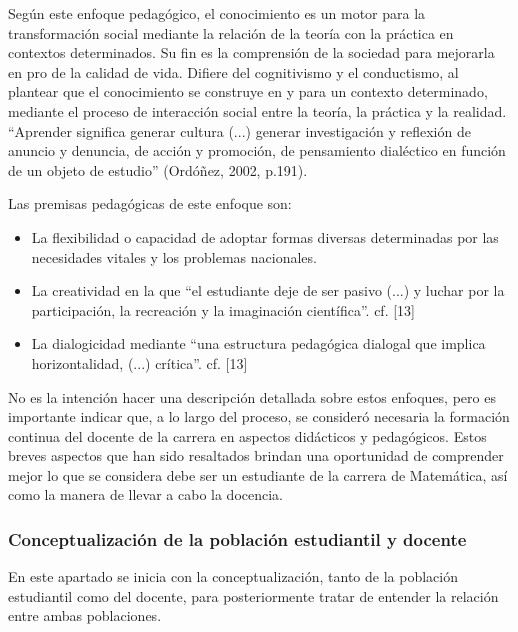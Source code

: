 Según este enfoque pedagógico, el conocimiento es un motor para la transformación social mediante la relación de la teoría con la práctica en contextos determinados. Su fin es la comprensión de la sociedad para mejorarla en pro de la calidad de vida. Difiere del cognitivismo y el conductismo, al plantear que el conocimiento se construye en y para un contexto determinado, mediante el proceso de interacción social entre la teoría, la práctica y la realidad. “Aprender significa generar cultura (...) generar investigación y reflexión de anuncio y denuncia, de acción y promoción, de pensamiento dialéctico en función de un objeto de estudio” (Ordóñez, 2002, p.191). 

Las premisas pedagógicas de este enfoque son: 

\begin{itemize}
    
    \color{blue} \item \color{black} La flexibilidad o capacidad de adoptar formas diversas determinadas por las necesidades vitales y los problemas nacionales. 

     \color{blue} \item \color{black} La creatividad en la que “el estudiante deje de ser pasivo (...) y luchar por la participación, la recreación y la imaginación científica”. cf. [13]
     
    \color{blue} \item \color{black} La dialogicidad mediante “una estructura pedagógica dialogal que implica horizontalidad, (...) crítica”. cf. [13] 
    \end{itemize}
    
No es la intención hacer una descripción detallada sobre estos enfoques, pero es importante indicar que, a lo largo del proceso, se consideró necesaria la formación continua del docente de la carrera en aspectos didácticos y pedagógicos. Estos breves aspectos que han sido resaltados brindan una oportunidad de comprender mejor lo que se considera debe ser un estudiante de la carrera de Matemática, así como la manera de llevar a cabo la docencia. 

\subsubsection{Conceptualización de la población estudiantil y docente}

En este apartado se inicia con la conceptualización, tanto de la población estudiantil como del docente, para posteriormente tratar de entender la relación entre ambas poblaciones.

